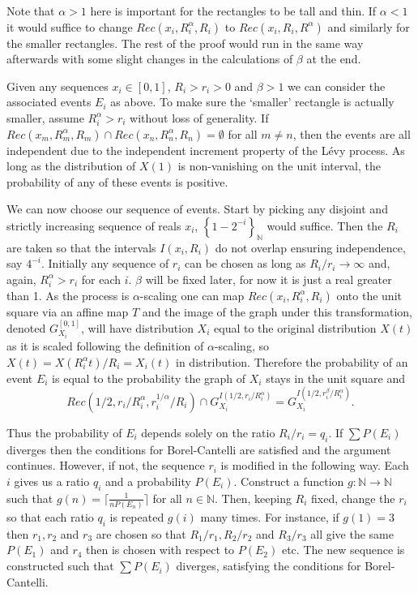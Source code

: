 Note that $\alpha>1$ here is important for the rectangles to be tall and thin. If $\alpha < 1$ it would suffice to change $Rec(x_i,R_i^{\alpha}, R_i)$ to $Rec(x_i, R_i, R^{\alpha})$ and similarly for the smaller rectangles. The rest of the proof would run in the same way afterwards with some slight changes in the calculations of $\beta$ at the end.

Given any sequences $x_i \in [0,1]$, $R_i > r_i > 0$ and $\beta > 1$ we can consider the associated events $E_i$ as above. To make sure the `smaller' rectangle is actually smaller, assume $R_i^{\alpha} > r_i$ without loss of generality. If $Rec(x_m,R_m^{\alpha}, R_m) \cap Rec(x_n,R_n^{\alpha},R_n) = \emptyset$ for all $m\neq n$, then the events are all independent due to the independent increment property of the L\'evy process. As long as the distribution of $X(1)$ is non-vanishing on the unit interval, the probability of any of these events is positive.

We can now choose our sequence of events. Start by picking any disjoint and strictly increasing sequence of reals  $x_i$, $\left\{1-2^{-i} \right\}_{\mathbb{N}}$ would suffice. Then the $R_i$ are taken so that the intervals $I(x_i, R_i)$ do not overlap ensuring independence, say $4^{-i}$. Initially any sequence of $r_i$ can be chosen as long as $R_i/r_i \rightarrow \infty$ and, again, $R_i^{\alpha} > r_i$ for each $i$. $\beta$ will be fixed later, for now it is just a real greater than 1. As the process is $\alpha$-scaling one can map $Rec(x_i,R_i^{\alpha},R_i)$ onto the unit square via an affine map $T$ and the image of the graph under this transformation, denoted $G_{X_i}^{[0,1]}$, will have distribution $X_i$ equal to the original distribution $X(t)$ as it is scaled following the definition of $\alpha$-scaling, so $X(t) = X(R_i^\alpha t)/R_i = X_i(t)$ in distribution. Therefore the probability of an event $E_i$ is equal to the probability the graph of $X_i$ stays in the unit square and 
$$Rec(1/2,r_i/R_i^{\alpha} ,r_i^{1/\alpha}/R_i ) \cap G_{X_i}^{I(1/2, r_i/R_i^{\alpha})} = G_{X_i}^{I(1/2, r_i^{\beta}/R_i^{\alpha})}.$$

Thus the probability of $E_i$ depends solely on the ratio $R_i/r_i = q_i$. If $\sum P(E_i)$ diverges then the conditions for Borel-Cantelli are satisfied and the argument continues. However, if not, the sequence $r_i$ is modified in the following way. Each $i$ gives us a ratio $q_i$ and a probability $P(E_i)$. Construct a function $g \colon \mathbb{N} \rightarrow \mathbb{N}$ such that $g(n) = \lceil \frac{1}{nP(E_n)}\rceil$ for all $n\in \mathbb{N}$. Then, keeping $R_i$ fixed, change the $r_i$ so that each ratio $q_i$ is repeated $g(i)$ many times. For instance, if $g(1) = 3$ then $r_1,r_2$ and $r_3$ are chosen so that $R_1/r_1, R_2/r_2$ and $R_3/r_3$ all give the same $P(E_1)$ and $r_4$ then is chosen with respect to $P(E_2)$ etc. The new sequence is constructed such that $\sum P(E_i)$ diverges, satisfying the conditions for Borel-Cantelli.

